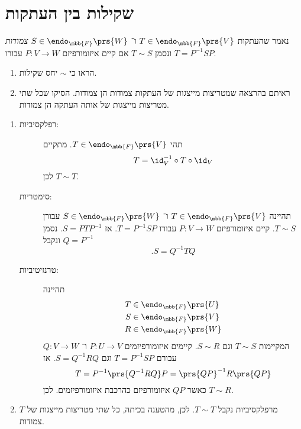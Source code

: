 \documentclass[a4paper,10pt,oneside,openany]{article}
\begin{document}
\section{שקילות בין העתקות}

\begin{exercise}
נאמר שהעתקות
$T \in \endo_{\mbb{F}}\prs{V}$
ו־%
$S \in \endo_{\mbb{F}}\prs{W}$
\emph{צמודות}
ונסמן
$T \sim S$
אם קיים איזומורפיזם
$P \colon V \to W$
עבורו
$T = P^{-1} S P$.

\begin{enumerate}
\item הראו כי
$\sim$
יחס שקילות.
\item ראיתם בהרצאה שמטריצות מייצגות של העתקות צמודות הן צמודות.
הסיקו שכל שתי מטריצות מייצגות של אותה העתקה הן צמודות.
\end{enumerate}
\end{exercise}

\begin{solution}
\begin{enumerate}
\item
\begin{description}
\item[רפלקסיביות:]
תהי
$T \in \endo_{\mbb{F}}\prs{V}$.
מתקיים
\[T = \id_V^{-1} \circ T \circ \id_V\]
לכן
$T \sim T$.
\item[סימטריות:]
תהיינה
$T \in \endo_{\mbb{F}}\prs{V}$
ו־%
$S \in \endo_{\mbb{F}}\prs{W}$
עבורן
$T \sim S$.
קיים איזומורפיזם
$P \colon V \to W$
עבורו
$T = P^{-1} S P$.
אז
$S = P T P^{-1}$.
נסמן
$Q = P^{-1}$
ונקבל
\[\text{.} S = Q^{-1} T Q\]
\item[טרנזיטיביות:]
תהיינה
\begin{align*}
T &\in \endo_{\mbb{F}}\prs{U} \\
S &\in \endo_{\mbb{F}}\prs{V} \\
R &\in \endo_{\mbb{F}}\prs{W}
\end{align*}
המקיימות
$T \sim S$
וגם
$S \sim R$.
קיימים איזומורפיזמים
$P \colon U \to V$
ו־%
$Q \colon V \to W$
עבורם
$T = P^{-1} S P$
וגם
$S = Q^{-1} R Q$.
אז
\[T = P^{-1}\prs{Q^{-1} R Q}P = \prs{QP}^{-1} R \prs{QP}\]
כאשר
$QP$
איזומורפיזם כהרכבת איזומורפיזמים.
לכן
$T \sim R$.
\end{description}

\item
מרפלקסיביות נקבל
$T \sim T$.
לכן, מהטענה בכיתה, כל שתי מטריצות מייצגות של
$T$
צמודות.
\end{enumerate}
\end{solution}
\end{document}
